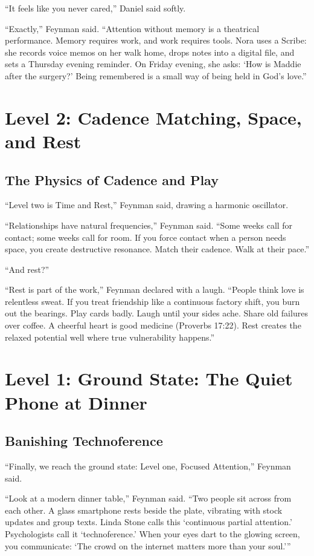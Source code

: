 \documentclass[11pt]{report}
\begin{document}
``It feels like you never cared,'' Daniel said softly.

``Exactly,'' Feynman said. ``Attention without memory is a theatrical performance. Memory requires work, and work requires tools. Nora uses a Scribe: she records voice memos on her walk home, drops notes into a digital file, and sets a Thursday evening reminder. On Friday evening, she asks: `How is Maddie after the surgery?' Being remembered is a small way of being held in God's love.''

\chapter{Level 2: Cadence Matching, Space, and Rest}

\section{The Physics of Cadence and Play}
``Level two is Time and Rest,'' Feynman said, drawing a harmonic oscillator.

``Relationships have natural frequencies,'' Feynman said. ``Some weeks call for contact; some weeks call for room. If you force contact when a person needs space, you create destructive resonance. Match their cadence. Walk at their pace.''

``And rest?''

``Rest is part of the work,'' Feynman declared with a laugh. ``People think love is relentless sweat. If you treat friendship like a continuous factory shift, you burn out the bearings. Play cards badly. Laugh until your sides ache. Share old failures over coffee. A cheerful heart is good medicine (Proverbs 17:22). Rest creates the relaxed potential well where true vulnerability happens.''

\chapter{Level 1: Ground State: The Quiet Phone at Dinner}

\section{Banishing Technoference}
``Finally, we reach the ground state: Level one, Focused Attention,'' Feynman said.

``Look at a modern dinner table,'' Feynman said. ``Two people sit across from each other. A glass smartphone rests beside the plate, vibrating with stock updates and group texts. Linda Stone calls this `continuous partial attention.' Psychologists call it `technoference.' When your eyes dart to the glowing screen, you communicate: `The crowd on the internet matters more than your soul.'''
\end{document}
